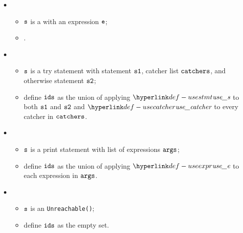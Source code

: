 \begin{itemize}
  \item {}
  \begin{itemize}
    \item $\vs$ is a \throwstatementsterm{} with an \optional{} expression $\ve$;
    \item {}.
  \end{itemize}

  \item {}
  \begin{itemize}
    \item $\vs$ is a try statement with statement $\vsone$, catcher list $\catchers$, and otherwise statement $\vstwo$;
    \item define $\ids$ as the union of applying $\usestmt$ to both $\vsone$ and $\vstwo$ and $\usecatcher$ to
          every catcher in $\catchers$.
  \end{itemize}

  \item {}
  \begin{itemize}
    \item $\vs$ is a print statement with list of expressions $\vargs$;
    \item define $\ids$ as the union of applying $\useexpr$ to each expression in $\vargs$.
  \end{itemize}

  \item {}
  \begin{itemize}
    \item $\vs$ is an \texttt{Unreachable()};
    \item define $\ids$ as the empty set.
  \end{itemize}
\end{itemize}

\FormallyParagraph
\begin{mathpar}
\end{mathpar}


